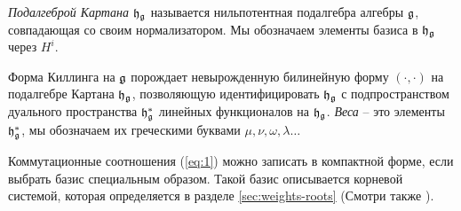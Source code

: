 {\it Подалгеброй Картана}  $\mathfrak{h}_{\mathfrak{g}}$ называется нильпотентная подалгебра алгебры $\mathfrak{g}$, совпадающая со своим нормализатором. Мы обозначаем элементы базиса в $\mathfrak{h}_{\mathfrak{g}}$ через $H^{i}$.

Форма Киллинга на  $\mathfrak{g}$ порождает невырожденную билинейную форму $(\cdot,\cdot)$ на подалгебре Картана $\mathfrak{h}_{\mathfrak{g}}$, позволяющую идентифицировать $\mathfrak{h}_{\mathfrak{g}}$ с подпространством дуального пространства  $\mathfrak{h}_{\mathfrak{g}}^{*}$ линейных функционалов на $\mathfrak{h}_{\mathfrak{g}}$. {\it Веса}  -- это элементы  $\mathfrak{h}_{\mathfrak{g}}^{*}$, мы обозначаем их греческими буквами $\mu,\nu, \omega, \lambda\dots$


Коммутационные соотношения  (\ref{eq:1}) можно записать в компактной форме, если выбрать базис специальным образом. Такой базис описывается корневой системой, которая определяется в разделе \ref{sec:weights-roots} (Смотри также \cite{humphreys1997introduction,humphreys1992reflection}).

